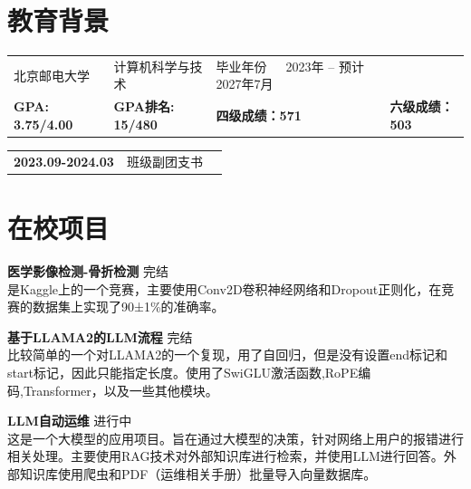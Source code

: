 \section{\makebox[\widthof{\faGraduationCap}][c]{\color{BUPT_Blue}{\faGraduationCap}}\quad 教育背景}
\vspace{-0.5em}
\begin{table}[h!]
    \begin{tabularx}{\textwidth}{XXp{}}
        北京邮电大学 & 计算机科学与技术 & 毕业年份\ \ \ 2023年 -- 预计2027年7月\\
        \textbf{GPA: 3.75/4.00} & \textbf{GPA排名: 15/480} &\textbf{四级成绩：571}&\textbf{六级成绩：503} \\
    \end{tabularx}
\end{table}
\begin{tabularx}{\textwidth}{@{}XlX@{}}
    \textbf{2023.09-2024.03} & 班级副团支书
\end{tabularx}

\section{\makebox[\widthof{\faChalkboardTeacher}][c]{\color{BUPT_Blue}{\faChalkboardTeacher}}\quad 在校项目}
\vspace{0.5em}
{\large{\textbf{医学影像检测-骨折检测}}} \hfill {完结}\\
是Kaggle上的一个竞赛，主要使用Conv2D卷积神经网络和Dropout正则化，在竞赛的数据集上实现了90±1\%的准确率。

\vspace{1em}
{\large{\textbf{基于LLAMA2的LLM流程}}} \hfill {完结}\\
比较简单的一个对LLAMA2的一个复现，用了自回归，但是没有设置end标记和start标记，因此只能指定长度。使用了SwiGLU激活函数,RoPE编码,Transformer，以及一些其他模块。

\vspace{1em}
{\large{\textbf{LLM自动运维}}} \hfill {进行中}\\
这是一个大模型的应用项目。旨在通过大模型的决策，针对网络上用户的报错进行相关处理。主要使用RAG技术对外部知识库进行检索，并使用LLM进行回答。外部知识库使用爬虫和PDF（运维相关手册）批量导入向量数据库。

